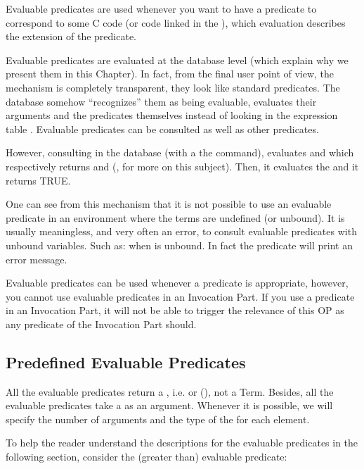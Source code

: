 Evaluable predicates are used whenever you want to have a predicate to
correspond to some C code (or code linked in the \CPK{}), which
evaluation describes the extension of the predicate.

Evaluable predicates are evaluated at the database level (which explain
why we present them in this Chapter). In fact, from the final user point of
view, the mechanism is completely transparent, they look like standard predicates. The
database somehow ``recognizes'' them as being evaluable, evaluates
their arguments and the predicates themselves instead of looking in the
expression table . Evaluable predicates can be consulted as well as other
predicates.

However, consulting  in the database (with a
the  command), evaluates  and  which respectively returns  and  (, for more on this subject). Then, it
evaluates the  and it returns TRUE.

One can see from this mechanism that it is not possible to use an evaluable
predicate in an environment where the terms are undefined (or unbound). It is
usually meaningless, and very often an error, to consult evaluable predicates
with unbound variables. Such as:\*  when  is unbound.
In fact the \code{>} predicate will print an error message.

Evaluable predicates can be used whenever a predicate is appropriate,
however, you cannot use evaluable predicates in an Invocation Part. If you
use a predicate in an Invocation Part, it will not be able to trigger the
relevance of this OP as any predicate of the Invocation Part should.


\subsection{Predefined Evaluable Predicates}

All the evaluable predicates return a , i.e.  or
 (), not a Term. Besides, all the
evaluable predicates take a  as an argument. Whenever it is
possible, we will specify the number of arguments and the type of the
 for each element.

To help the reader understand the descriptions for the evaluable predicates
in the following section, consider the \code{>} (greater than) evaluable predicate:

